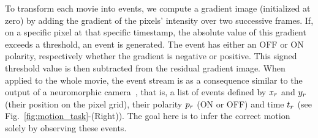 \documentclass[default]{sn-jnl}%
\theoremstyle{thmstyleone}%
\theoremstyle{thmstyletwo}%
\theoremstyle{thmstylethree}%
\newcommand{\seeFig}[1]{see Fig.~\ref{fig:#1}}%
\newcommand{\note}[1]{{\sethlcolor{yellow}\hl{#1}}}
\begin{document}
To transform each movie into events, we compute a gradient image (initialized at zero) by adding the gradient of the pixels' intensity over two successive frames. If, on a specific pixel at that specific timestamp, the absolute value of this gradient exceeds a threshold, an event is generated. The event has either an OFF or ON polarity, respectively whether the gradient is negative or positive. This signed threshold value is then subtracted from the residual gradient image. When applied to the whole movie, the event stream is as a consequence similar to the output of a neuromorphic camera~\citep{rasetto_challenges_2022}, that is, a list of events defined by $x_r$ and $y_r$ (their position on the pixel grid), their polarity $p_r$ (ON or OFF) and time $t_r$  (\seeFig{motion_task}-(Right)). The goal here is to infer the correct motion solely by observing these events. 
%
\end{document}
